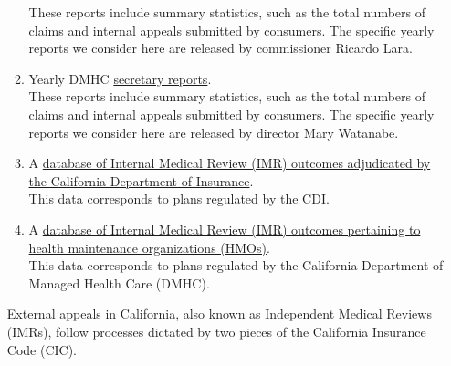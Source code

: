 \documentclass[12pt, a4paper,twoside]{report}
\theoremstyle{plain} %
\theoremstyle{definition} %
\theoremstyle{remark} %
\numberwithin{equation}{chapter}
\begin{document}
\begin{itemize}
\begin{tcolorbox}
\begin{enumerate}
				These reports include summary statistics, such as the total numbers of claims and internal appeals submitted by consumers. The specific yearly reports we consider here are released by commissioner Ricardo Lara. \\
				
				\item Yearly DMHC \href{https://dmhc.ca.gov/AbouttheDMHC/DMHCReports/AnnualReports.aspx}{secretary reports}.\\
				
				These reports include summary statistics, such as the total numbers of claims and internal appeals submitted by consumers. The specific yearly reports we consider here are released by director Mary Watanabe.\\
				
				\item A \href{https://interactive.web.insurance.ca.gov/apex_extprd/f?p=192:1:5191948876739:::::}{database of Internal Medical Review (IMR) outcomes adjudicated by the California Department of Insurance}.\\
				
				This data corresponds to plans regulated by the CDI.\\
				
				\item A \href{https://data.chhs.ca.gov/dataset/independent-medical-review-imr-determinations-trend}{database of Internal Medical Review (IMR) outcomes pertaining to health maintenance organizations (HMOs)}.\\
				
				This data corresponds to plans regulated by the California Department of Managed Health Care (DMHC).\\
				
			\end{enumerate}
			
			External appeals in California, also known as Independent Medical Reviews (IMRs), follow processes dictated by two pieces of the California Insurance Code (CIC).\\
			
			\begin{itemize}
				

\end{itemize}
\end{tcolorbox}
\end{itemize}
\end{document}
